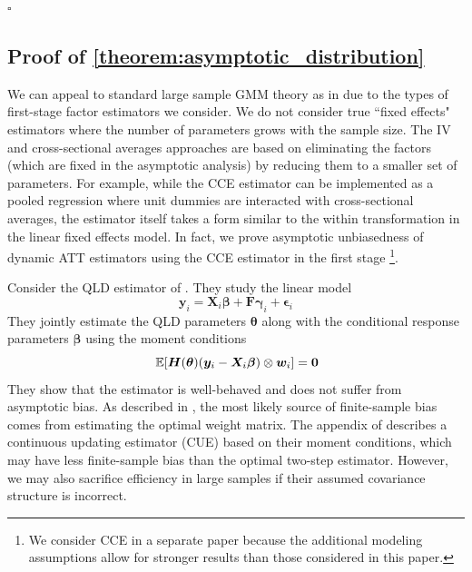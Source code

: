\documentclass[12pt]{article}
\begin{document}
$\square$

\subsection*{Proof of \autoref{theorem:asymptotic_distribution}}

We can appeal to standard large sample GMM theory as in \citet{Hansen_1982} due to the types of first-stage factor estimators we consider. We do not consider true ``fixed effects" estimators where the number of parameters grows with the sample size. The IV and cross-sectional averages approaches are based on eliminating the factors (which are fixed in the asymptotic analysis) by reducing them to a smaller set of parameters. For example, while the CCE estimator can be implemented as a pooled regression where unit dummies are interacted with cross-sectional averages, the estimator itself takes a form similar to the within transformation in the linear fixed effects model. In fact, we prove asymptotic unbiasedness of dynamic ATT estimators using the CCE estimator in the first stage \citep{Brown_Butts_Westerlund_2023}\footnote{We consider CCE in a separate paper because the additional modeling assumptions allow for stronger results than those considered in this paper.}.

Consider the QLD estimator of \citet{Ahn_Lee_Schmidt_2013}. They study the linear model
\begin{equation}
    \bm y_i = \bm X_i \bm \beta + \bm F \bm \gamma_i + \bm \epsilon_i
\end{equation}
They jointly estimate the QLD parameters $\bm \theta$ along with the conditional response parameters $\bm \beta$ using the moment conditions
\begin{equation}
    \expec{\bm H(\bm \theta) (\bm y_i - \bm X_i \bm \beta) \otimes \bm w_i} = \bm 0
\end{equation}
They show that the estimator is well-behaved and does not suffer from asymptotic bias. As described in \citet{windmeijer2005finite}, the most likely source of finite-sample bias comes from estimating the optimal weight matrix. The appendix of \citet{Ahn_Lee_Schmidt_2013} describes a continuous updating estimator (CUE) based on their moment conditions, which may have less finite-sample bias than the optimal two-step estimator. However, we may also sacrifice efficiency in large samples if their assumed covariance structure is incorrect. 
\end{document}
